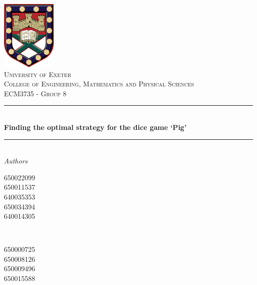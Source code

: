 \documentclass[a4paper,titlepage]{article}
\begin{document}
\begin{titlepage}
	\newcommand{\HRule}{\rule{\linewidth}{0.5mm}}
	\center


	\includegraphics[width=0.2\textwidth]{Crest.jpg}\\[1cm]


	\textsc{\LARGE University of Exeter}\\[1.5cm]

	\textsc{\Large College of Engineering, Mathematics and Physical Sciences}\\[0.5cm]

	\textsc{\large ECM3735 - Group 8}\\[0.5cm]


	\HRule\\[0.4cm]

	{\huge\bfseries Finding the optimal strategy for the dice game `Pig'}\\[0.4cm]

	\HRule\\[1.5cm]


	\LARGE\textit{Authors}\\
	\begin{minipage}{0.4\textwidth}
		\begin{flushleft}
			\large
			\textsc{650022099}\\
			\textsc{650011537}\\
			\textsc{640035353}\\
			\textsc{650034394}\\
			\textsc{640014305}
		\end{flushleft}
	\end{minipage}
	~
	\begin{minipage}{0.4\textwidth}
		\begin{flushright}
			\large
		     \textsc{650000725}\\
			 \textsc{650008126}\\
			 \textsc{650009496}\\
			 \textsc{650015588}\\
			\vspace*{10pt§}
		\end{flushright}
	\end{minipage}


\end{titlepage}
\end{document}
